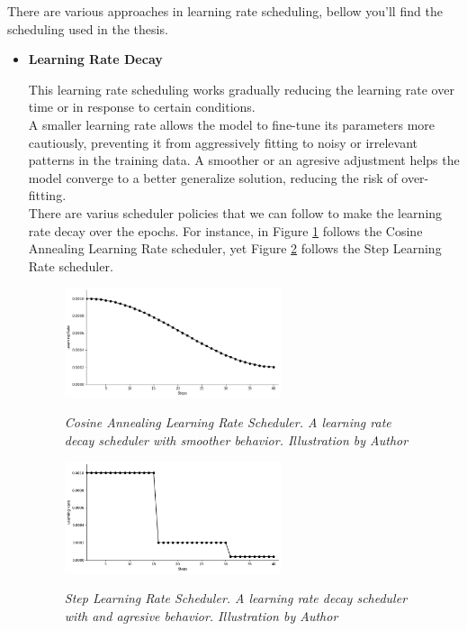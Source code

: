 There are various approaches in learning rate scheduling, bellow you'll find
the scheduling used in the thesis.

\begin{itemize}
  \item \textbf{Learning Rate Decay}

    This learning rate scheduling works gradually reducing the learning rate
    over time or in response to certain conditions. \\

    A smaller learning rate allows the model to fine-tune its parameters more
    cautiously, preventing it from aggressively fitting to noisy or
    irrelevant patterns in the training data. A smoother or an agresive
    adjustment helps the model converge to a better generalize solution,
    reducing the risk of over-fitting. \\

    There are varius scheduler policies that we can follow to make the
    learning rate decay over the epochs. For instance, in Figure
    \ref{fig:learning-rate-decay-cosine-annealing} follows the
    Cosine Annealing Learning Rate scheduler, yet Figure
    \ref{fig:learning-rate-decay-step} follows the Step Learning
    Rate scheduler.

    \begin{figure}[H] \centering
      \includegraphics[width=0.6\textwidth]{imatges/preliminaries/cosinus-scheduler.png}
      \caption[Cosine Annealing Learning Rate Scheduler]{\textit{Cosine
      Annealing Learning Rate Scheduler. A learning rate decay scheduler with
      smoother behavior. Illustration by Author}}
    {\label{fig:learning-rate-decay-cosine-annealing}} \end{figure}

    \begin{figure}[H] \centering
      \includegraphics[width=0.6\textwidth]{imatges/preliminaries/step-scheduler.png}
      \caption[Step Learning Rate Scheduler]{\textit{Step Learning Rate
      Scheduler. A learning rate decay scheduler with and agresive behavior.
      Illustration by Author}} {\label{fig:learning-rate-decay-step}}
    \end{figure}


\end{itemize}
